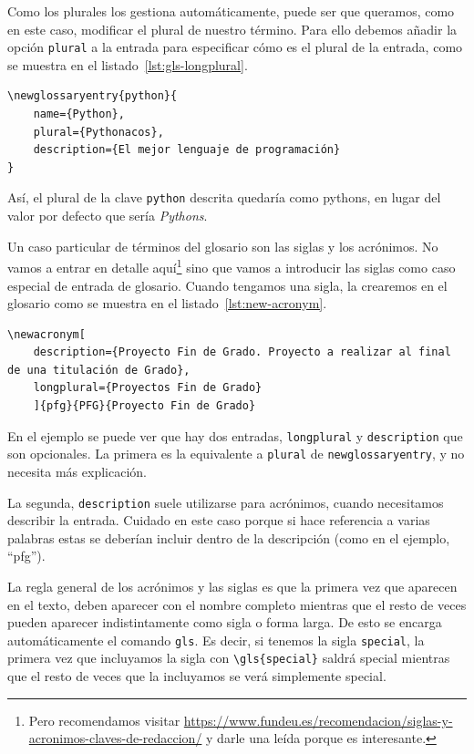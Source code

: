 \documentclass[%
    school=etsisi,%
    type=tfg,%
    degree=61CD,%
]{upm-report}
\begin{document}
Como los plurales los gestiona automáticamente, puede ser que queramos, como en este caso, modificar el plural de nuestro término. Para ello debemos añadir la opción \texttt{plural} a la entrada para especificar cómo es el plural de la entrada, como se muestra en el listado~\ref{lst:gls-longplural}.

\begin{lstlisting}[language={[latex]TeX},caption=Especificando el plural para un término del glosario,label=lst:gls-longplural]
\newglossaryentry{python}{
    name={Python},
    plural={Pythonacos},
    description={El mejor lenguaje de programación}
}
\end{lstlisting}

Así, el plural de la clave \texttt{python} descrita quedaría como \glspl{python}, en lugar del valor por defecto que sería \textit{Pythons}.

Un caso particular de términos del glosario son las siglas y los acrónimos. No vamos a entrar en detalle aquí\footnote{Pero recomendamos visitar \href{https://www.fundeu.es/recomendacion/siglas-y-acronimos-claves-de-redaccion/}{https://www.fundeu.es/recomendacion/siglas-y-acronimos-claves-de-redaccion/} y darle una leída porque es interesante.} sino que vamos a introducir las siglas como caso especial de entrada de glosario. Cuando tengamos una sigla, la crearemos en el glosario como se muestra en el listado~\ref{lst:new-acronym}.

\begin{lstlisting}[language={[latex]TeX},caption=Entrada genérica de una sigla o acrónimo en el glosario,label=lst:new-acronym]
\newacronym[
    description={Proyecto Fin de Grado. Proyecto a realizar al final de una titulación de Grado},
    longplural={Proyectos Fin de Grado}
    ]{pfg}{PFG}{Proyecto Fin de Grado}
\end{lstlisting}

En el ejemplo se puede ver que hay dos entradas, \texttt{longplural} y \texttt{description} que son opcionales. La primera es la equivalente a \texttt{plural} de \texttt{newglossaryentry}, y no necesita más explicación.

La segunda, \texttt{description} suele utilizarse para acrónimos, cuando necesitamos describir la entrada. Cuidado en este caso porque si hace referencia a varias palabras estas se deberían incluir dentro de la descripción (como en el ejemplo, \enquote{\acrlong{pfg}}).

La regla general de los acrónimos y las siglas es que la primera vez que aparecen en el texto, deben aparecer con el nombre completo mientras que el resto de veces pueden aparecer indistintamente como sigla o forma larga. De esto se encarga automáticamente el comando \texttt{gls}. Es decir, si tenemos la sigla \texttt{special}, la primera vez que incluyamos la sigla con \texttt{\textbackslash gls\{special\}} saldrá \gls{special} mientras que el resto de veces que la incluyamos se verá simplemente \gls{special}.
\end{document}
